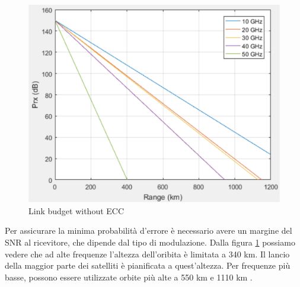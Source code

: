 \begin{figure}[htbp]
  \centering
  \includegraphics[width=0.8\linewidth]{./res/img/link_budget_w_ecc.png}
  \caption{Link budget without \ac{ECC}}
  \label{fig:link-budget-w-ecc}
\end{figure}

Per assicurare la minima probabilità d'errore è necessario avere un margine del \ac{SNR} al ricevitore, che dipende dal tipo di modulazione.
Dalla figura \ref{fig:link-budget-w-ecc} possiamo vedere che ad alte frequenze l'altezza dell'oribita è limitata a 340 km.
Il lancio della maggior parte dei satelliti è pianificata a quest'altezza.
Per frequenze più basse, possono essere utilizzate orbite più alte a 550 km e 1110 km \cite{rozenvasser_estimation_2023}.

